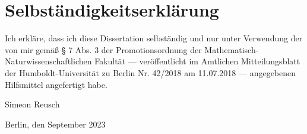 \chapter*{Selbständigkeitserklärung}\label{bla}

Ich erkläre, dass ich diese Dissertation selbständig und nur unter Verwendung der von mir gemäß § 7 Abs. 3 der Promotionsordnung der Mathematisch-Naturwissenschaftlichen Fakultät --- veröffentlicht im Amtlichen Mitteilungsblatt der Humboldt-Universität zu Berlin Nr. 42/2018 am 11.07.2018 --- angegebenen Hilfsmittel angefertigt habe.

\vspace{18mm}
\begin{minipage}{2in}
    Simeon Reusch
\end{minipage}
\hfill
\begin{minipage}{2in}
    Berlin, den \xx September 2023
\end{minipage}